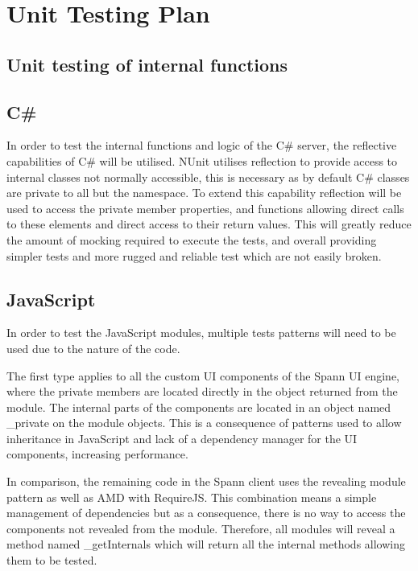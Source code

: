 \documentclass[12pt, titlepage]{article}
\begin{document}
				
\section{Unit Testing Plan}
		
\subsection{Unit testing of internal functions}

\subsection{C\#}
In order to test the internal functions and logic of the C\# server, the
reflective capabilities of C\# will be utilised. NUnit utilises reflection to
provide access to internal classes not normally accessible, this is necessary
as by default C\# classes are private to all but the namespace. To extend this
capability reflection will be used to access the private member properties, and
functions allowing direct calls to these elements and direct access to their
return values. This will greatly reduce the amount of mocking required to
execute the tests, and overall providing simpler tests and more rugged and
reliable test which are not easily broken. 

\subsection{JavaScript} In order to test the JavaScript modules, multiple tests
patterns will need to be used due to the nature of the code. 

The first type applies to all the custom UI components of the Spann UI engine,
where the private members are located directly in the object returned from the
module. The internal parts of the components are located in an object named
\_private on the module objects. This is a consequence of patterns used to allow
inheritance in JavaScript and lack of a dependency manager for the UI
components, increasing performance.  

In comparison, the remaining code in the Spann client uses the revealing module
pattern as well as AMD with RequireJS. This combination means a simple
management of dependencies but as a consequence, there is no way to access the
components not revealed from the module. Therefore, all modules will reveal a
method named \_getInternals which will return all the internal methods allowing
them to be tested. 
\end{document}
